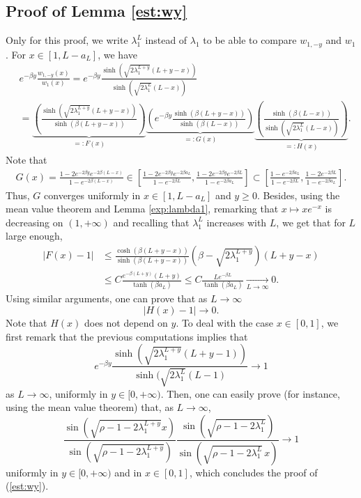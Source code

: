 \documentclass[11pt]{article}
\theoremstyle{plain}
\begin{document}
\begin{appendix}
\section{Proof of Lemma \ref{est:wy}}
Only for this proof, we write $\lambda_1^L$ instead of $\lambda_1$ to be able to compare $w_{1,-y}$ and $w_1$. For $x\in [1,L-a_L]$, we have 
\begin{align*}
&e^{-\beta y}\frac{w_{1,-y}(x)}{w_1(x)}=e^{-\beta y}\frac{\sinh\left(\sqrt{2\lambda_1^{L+y}}(L+y-x)\right)}{\sinh\left(\sqrt{2\lambda_1^{L}}(L-x)\right)}\\
&= \underbrace{\left(\frac{\sinh\left(\sqrt{2\lambda_1^{L+y}}(L+y-x)\right)}{\sinh\left(\beta(L+y-x)\right)}\right)}_{\textstyle =:F(x)}\underbrace{\left(e^{-\beta y}\frac{\sinh\left(\beta(L+y-x)\right)}{\sinh\left(\beta(L-x)\right)}
\right)}_{\textstyle =:G(x)}\underbrace{\left(\frac{\sinh\left(\beta(L-x)\right)}{\sinh\left(\sqrt{2\lambda_1^{L}}(L-x)\right)}
\right)}_{\textstyle =:H(x)}.
\end{align*}
Note that
\begin{align*}
G(x)=\frac{1-2e^{-2\beta y}e^{-2\beta(L-x)}}{1-e^{-2\beta(L-x)}}\in\left[\frac{1-2e^{-2\beta y}e^{-2\beta a_L}}{1-e^{-2\beta L}},\frac{1-2e^{-2\beta y}e^{-2\beta L}}{1-e^{-2\beta a_L}}\right]\subset\left[\frac{1-e^{-2\beta a_L}}{1-e^{-2\beta L}},\frac{1-2e^{-2\beta L}}{1-e^{-2\beta a_L}}\right].
\end{align*}
Thus, $G$ converges uniformly in $x\in[1,L-a_L]$ and $y\geqslant 0$.
Besides, using the mean value theorem and Lemma \ref{exp:lambda1}, remarking that $x\mapsto xe^{-x}$ is decreasing on $(1,+\infty)$ and recalling that $\lambda_1^L$ increases with $L$, we get that  for $L$ large enough, 
\begin{align*}
|F(x)-1|&\leqslant \frac{\cosh\left(\beta(L+y-x)\right)}{\sinh\left(\beta(L+y-x)\right)}\left(\beta-\sqrt{2\lambda_1^{L+y}}\right)(L+y-x) \\
&\leqslant C\frac{e^{-\beta(L+y)}(L+y)}{\tanh(\beta a_L) }\leqslant C\frac{Le^{-\beta L}}{\tanh(\beta a_L) } \xrightarrow[L\to\infty]{} 0.
\end{align*}
Using similar arguments, one can prove that as $L\to\infty$
\begin{equation*}
|H(x)-1|\to 0.
\end{equation*}
Note that $H(x)$ does not depend on $y$. To deal with the case $x\in[0,1]$, we first remark that the previous computations implies that \begin{equation*}
e^{-\beta y}\frac{\sinh\left(\sqrt{2\lambda_1^{L+y}}(L+y-1)\right)}{\sinh(\sqrt{2\lambda_1^L}(L-1)}\to 1
\end{equation*} as $L\to \infty$, uniformly in $y\in[0,+\infty)$. Then, one can easily prove (for instance, using the mean value theorem) that, as $L\to\infty$, 
\begin{equation*}
\frac{\sin\left(\sqrt{\rho-1-2\lambda_1^{L+y}}x\right)}{\sin\left(\sqrt{\rho-1-2\lambda_1^{L+y}}\right)}\frac{\sin\left(\sqrt{\rho-1-2\lambda_1^{L}}\right)}{\sin\left(\sqrt{\rho-1-2\lambda_1^{L}}
\,x\right)}\to 1
\end{equation*}
uniformly in $y\in[0,+\infty)$ and in $x\in[0,1]$, which concludes the proof of (\ref{est:wy}).
\label{proof:lem71}

\end{appendix}




\end{document}
